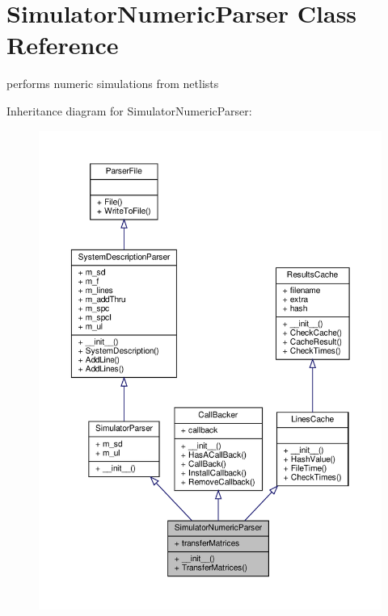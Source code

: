 \hypertarget{classSignalIntegrity_1_1Parsers_1_1SimulatorNumericParser_1_1SimulatorNumericParser}{}\section{Simulator\+Numeric\+Parser Class Reference}
\label{classSignalIntegrity_1_1Parsers_1_1SimulatorNumericParser_1_1SimulatorNumericParser}


performs numeric simulations from netlists  




Inheritance diagram for Simulator\+Numeric\+Parser\+:
\nopagebreak
\begin{figure}[H]
\begin{center}
\leavevmode
\includegraphics[width=350pt]{classSignalIntegrity_1_1Parsers_1_1SimulatorNumericParser_1_1SimulatorNumericParser__inherit__graph}
\end{center}
\end{figure}


